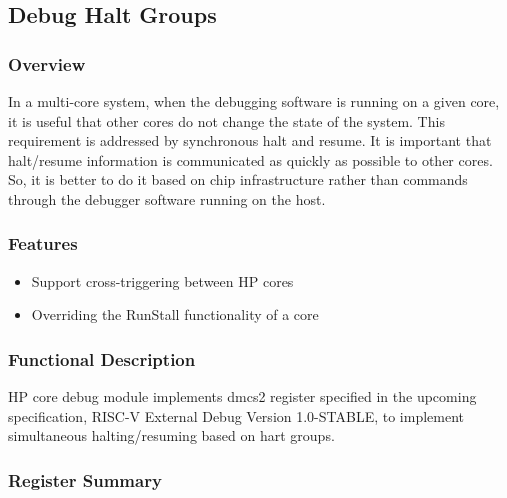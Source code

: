 \documentclass[main\_\_EN.tex]{subfiles}
\begin{document}



\newpage
\subsection{Debug Halt Groups}
\label{sec:riscvcpu-cti}
\subsubsection{Overview}
\label{sec:riscvcpu-cti-overview}
In a multi-core system, when the debugging software is running on a given core, it is useful that other cores do not change the state of the system. This requirement is addressed by synchronous halt and resume. It is important that halt/resume information is communicated as quickly as possible to other cores. So, it is better to do it based on chip infrastructure rather than commands through the debugger software running on the host.

\subsubsection{Features}
\label{sec:riscvcpu-cti-features}
\begin{itemize}
    \item Support cross-triggering between HP cores
    \item Overriding the RunStall functionality of a core
\end{itemize}

\subsubsection{Functional Description}
\label{sec:riscvcpu-cti-func-descr}

HP core debug module implements dmcs2 register specified in the upcoming specification, RISC-V External Debug Version 1.0-STABLE, to implement simultaneous halting/resuming based on hart groups.


\newpage
\hypertarget{riscvcpu-cti-reg-summ}{}
\subsubsection{Register Summary}
\label{sec:riscvcpu-dmcs2-desc}
\end{document}
